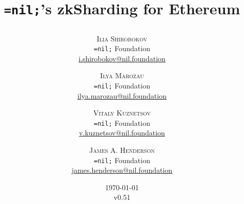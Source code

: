 \setlength{\droptitle}{-4\baselineskip} %

\pretitle{
    \begin{center}
    \end{center}
} %
\title{
    \begin{center}
        \Huge\bfseries \texttt{=nil;}'s zkSharding for Ethereum
    \end{center}
} %
\posttitle{
    \begin{center}
    \end{center}
} %
\author{%
    \textsc{Ilia Shirobokov} \\[1ex] %
    \normalsize \texttt{=nil;} Foundation \\ %
    \normalsize \href{mailto:i.shirobokov@nil.foundation}{i.shirobokov@nil.foundation} %
    \and 
    \textsc{Ilya Marozau} \\[1ex] %
    \normalsize \texttt{=nil;} Foundation \\ %
    \normalsize \href{mailto:ilya.marozau@nil.foundation}{ilya.marozau@nil.foundation} %
    \and 
    \textsc{Vitaly Kuznetsov} \\[1ex] %
    \normalsize \texttt{=nil;} Foundation \\ %
    \normalsize \href{mailto:v.kuznetsov@nil.foundation}{v.kuznetsov@nil.foundation} %
        \and 
    \textsc{James A. Henderson} \\[1ex] %
    \normalsize \texttt{=nil;} Foundation \\ %
    \normalsize \href{mailto:james.henderson@nil.foundation}{james.henderson@nil.foundation} %
}
\date{\today\\v0.51} %
